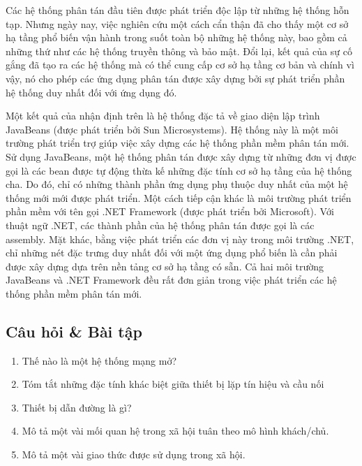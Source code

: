 Các hệ thống phân tán đầu tiên được phát triển độc lập từ những hệ thống hỗn tạp. Nhưng
ngày nay, việc nghiên cứu một cách cẩn thận đã cho thấy một cơ sở hạ tầng phổ biến vận
hành trong suốt toàn bộ những hệ thống này, bao gồm cả những thứ như các hệ thống truyền
thông và bảo mật. Đổi lại, kết quả của sự cố gắng đã tạo ra các hệ thống mà có thể cung
cấp cơ sở hạ tầng cơ bản và chính vì vậy, nó cho phép các ứng dụng phân tán được xây dựng
bởi sự phát triển phần hệ thống duy nhất đối với ứng dụng đó.

Một kết quả của nhận định trên là hệ thống đặc tả về giao diện lập trình JavaBeans (được
phát triển bởi Sun Microsystems). Hệ thống này là một môi trường phát triển trợ giúp việc
xây dựng các hệ thống phần mềm phân tán mới. Sử dụng JavaBeans, một hệ thống phân tán được
xây dựng từ những đơn vị được gọi là các bean được tự động thừa kế những đặc tính cơ sở hạ
tầng của hệ thống cha. Do đó, chỉ có những thành phần ứng dụng phụ thuộc duy nhất của một
hệ thống mới mới được phát triển. Một cách tiếp cận khác là môi trường phát triển phần mềm
với tên gọi .NET Framework (được phát triển bởi Microsoft). Với thuật ngữ .NET, các thành
phần của hệ thống phân tán được gọi là các assembly. Mặt khác, bằng việc phát triển các
đơn vị này trong môi trường .NET, chỉ những nét đặc trưng duy nhất đối với một ứng dụng
phổ biến là cần phải được xây dựng dựa trên nền tảng cơ sở hạ tầng có sẵn. Cả hai môi
trường JavaBeans và .NET Framework đều rất đơn giản trong việc phát triển các hệ thống
phần mềm phân tán mới.

\subsection*{Câu hỏi \& Bài tập}

\begin{enumerate}
\item Thế nào là một hệ thống mạng mở?

\item Tóm tắt những đặc tính khác biệt giữa thiết bị lặp tín hiệu và cầu nối

\item Thiết bị dẫn đường là gì?

\item Mô tả một vài mối quan hệ trong xã hội tuân theo mô hình khách/chủ.

\item Mô tả một vài giao thức được sử dụng trong xã hội.

\end{enumerate}



